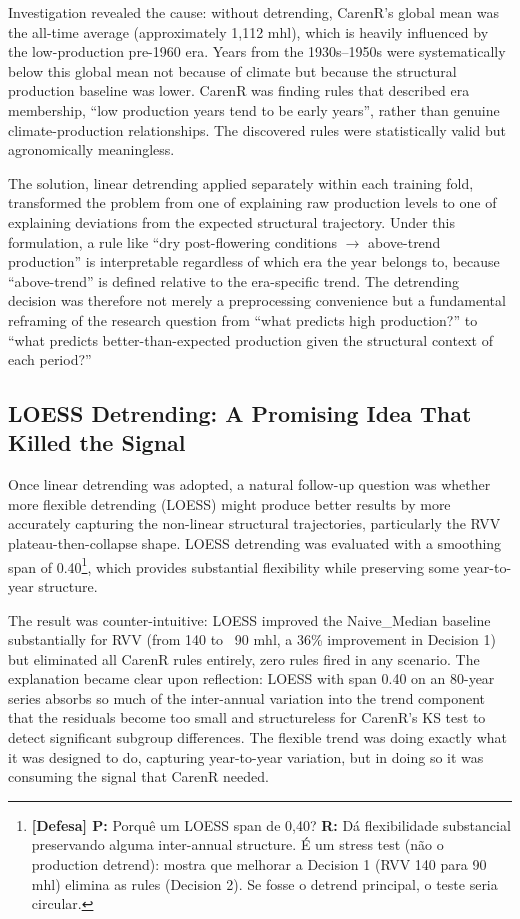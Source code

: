 Investigation revealed the cause: without detrending, CarenR's global mean was the all-time average (approximately 1,112 mhl), which is heavily influenced by the low-production pre-1960 era. Years from the 1930s--1950s were systematically below this global mean not because of climate but because the structural production baseline was lower. CarenR was finding rules that described era membership, ``low production years tend to be early years'', rather than genuine climate-production relationships. The discovered rules were statistically valid but agronomically meaningless.

The solution, linear detrending applied separately within each training fold, transformed the problem from one of explaining raw production levels to one of explaining deviations from the expected structural trajectory. Under this formulation, a rule like ``dry post-flowering conditions $\rightarrow$ above-trend production'' is interpretable regardless of which era the year belongs to, because ``above-trend'' is defined relative to the era-specific trend. The detrending decision was therefore not merely a preprocessing convenience but a fundamental reframing of the research question from ``what predicts high production?'' to ``what predicts better-than-expected production given the structural context of each period?''


\subsection{LOESS Detrending: A Promising Idea That Killed the Signal}\label{sub:loess_detrending_a_promising}

Once linear detrending was adopted, a natural follow-up question was whether more flexible detrending (LOESS) might produce better results by more accurately capturing the non-linear structural trajectories, particularly the RVV plateau-then-collapse shape. LOESS detrending was evaluated with a smoothing span of 0.40\footnote{\textbf{[Defesa] P:} Porquê um LOESS span de 0,40? \textbf{R:} Dá flexibilidade substancial preservando alguma inter-annual structure. É um stress test (não o production detrend): mostra que melhorar a Decision 1 (RVV 140 para 90 mhl) elimina as rules (Decision 2). Se fosse o detrend principal, o teste seria circular.}, which provides substantial flexibility while preserving some year-to-year structure.

The result was counter-intuitive: LOESS improved the Naive\_Median baseline substantially for RVV (from 140 to ~90 mhl, a 36\% improvement in Decision 1) but eliminated all CarenR rules entirely, zero rules fired in any scenario. The explanation became clear upon reflection: LOESS with span 0.40 on an 80-year series absorbs so much of the inter-annual variation into the trend component that the residuals become too small and structureless for CarenR's KS test to detect significant subgroup differences. The flexible trend was doing exactly what it was designed to do, capturing year-to-year variation, but in doing so it was consuming the signal that CarenR needed.

